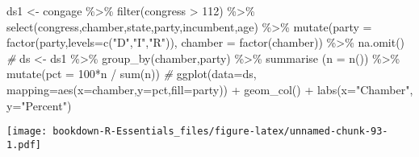 \documentclass[
]{book}
\newenvironment{Shaded}{\begin{snugshade}}{\end{snugshade}}
\newcommand{\AttributeTok}[1]{\textcolor[rgb]{0.77,0.63,0.00}{#1}}
\newcommand{\CommentTok}[1]{\textcolor[rgb]{0.56,0.35,0.01}{\textit{#1}}}
\newcommand{\DecValTok}[1]{\textcolor[rgb]{0.00,0.00,0.81}{#1}}
\newcommand{\FunctionTok}[1]{\textcolor[rgb]{0.00,0.00,0.00}{#1}}
\newcommand{\NormalTok}[1]{#1}
\newcommand{\OtherTok}[1]{\textcolor[rgb]{0.56,0.35,0.01}{#1}}
\newcommand{\SpecialCharTok}[1]{\textcolor[rgb]{0.00,0.00,0.00}{#1}}
\newcommand{\StringTok}[1]{\textcolor[rgb]{0.31,0.60,0.02}{#1}}
\begin{document}
\begin{Shaded}
\begin{Highlighting}[]
\NormalTok{ds1 }\OtherTok{\textless{}{-}}\NormalTok{ congage }\SpecialCharTok{\%\textgreater{}\%} \FunctionTok{filter}\NormalTok{(congress }\SpecialCharTok{\textgreater{}} \DecValTok{112}\NormalTok{) }\SpecialCharTok{\%\textgreater{}\%} \FunctionTok{select}\NormalTok{(congress,chamber,state,party,incumbent,age) }\SpecialCharTok{\%\textgreater{}\%}
 \FunctionTok{mutate}\NormalTok{(}\AttributeTok{party =} \FunctionTok{factor}\NormalTok{(party,}\AttributeTok{levels=}\FunctionTok{c}\NormalTok{(}\StringTok{"D"}\NormalTok{,}\StringTok{"I"}\NormalTok{,}\StringTok{"R"}\NormalTok{)),}
        \AttributeTok{chamber =} \FunctionTok{factor}\NormalTok{(chamber)) }\SpecialCharTok{\%\textgreater{}\%} 
  \FunctionTok{na.omit}\NormalTok{()}
\CommentTok{\#}
\NormalTok{ds }\OtherTok{\textless{}{-}}\NormalTok{ ds1 }\SpecialCharTok{\%\textgreater{}\%} \FunctionTok{group\_by}\NormalTok{(chamber,party)  }\SpecialCharTok{\%\textgreater{}\%}
   \FunctionTok{summarise}\NormalTok{ (}\AttributeTok{n =} \FunctionTok{n}\NormalTok{()) }\SpecialCharTok{\%\textgreater{}\%}
  \FunctionTok{mutate}\NormalTok{(}\AttributeTok{pct =} \DecValTok{100}\SpecialCharTok{*}\NormalTok{n }\SpecialCharTok{/} \FunctionTok{sum}\NormalTok{(n)) }
\CommentTok{\#}
\FunctionTok{ggplot}\NormalTok{(}\AttributeTok{data=}\NormalTok{ds, }\AttributeTok{mapping=}\FunctionTok{aes}\NormalTok{(}\AttributeTok{x=}\NormalTok{chamber,}\AttributeTok{y=}\NormalTok{pct,}\AttributeTok{fill=}\NormalTok{party)) }\SpecialCharTok{+} 
  \FunctionTok{geom\_col}\NormalTok{() }\SpecialCharTok{+}
  \FunctionTok{labs}\NormalTok{(}\AttributeTok{x=}\StringTok{"Chamber"}\NormalTok{, }\AttributeTok{y=}\StringTok{"Percent"}\NormalTok{)}
\end{Highlighting}
\end{Shaded}

\texttt{[image: bookdown-R-Essentials\_files/figure-latex/unnamed-chunk-93-1.pdf]}
\end{document}
